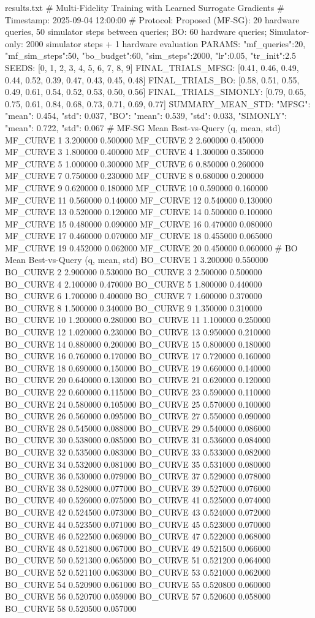 \begin{filecontents*}{results.txt}
# Multi-Fidelity Training with Learned Surrogate Gradients
# Timestamp: 2025-09-04 12:00:00
# Protocol: Proposed (MF-SG): 20 hardware queries, 50 simulator steps between queries; BO: 60 hardware queries; Simulator-only: 2000 simulator steps + 1 hardware evaluation
PARAMS: {"mf_queries":20, "mf_sim_steps":50, "bo_budget":60, "sim_steps":2000, "lr":0.05, "tr_init":2.5}
SEEDS: [0, 1, 2, 3, 4, 5, 6, 7, 8, 9]
FINAL_TRIALS_MFSG: [0.41, 0.46, 0.49, 0.44, 0.52, 0.39, 0.47, 0.43, 0.45, 0.48]
FINAL_TRIALS_BO: [0.58, 0.51, 0.55, 0.49, 0.61, 0.54, 0.52, 0.53, 0.50, 0.56]
FINAL_TRIALS_SIMONLY: [0.79, 0.65, 0.75, 0.61, 0.84, 0.68, 0.73, 0.71, 0.69, 0.77]
SUMMARY_MEAN_STD: {"MFSG": {"mean": 0.454, "std": 0.037}, "BO": {"mean": 0.539, "std": 0.033}, "SIMONLY": {"mean": 0.722, "std": 0.067}}
# MF-SG Mean Best-vs-Query (q, mean, std)
MF_CURVE 1 3.200000 0.500000
MF_CURVE 2 2.600000 0.450000
MF_CURVE 3 1.800000 0.400000
MF_CURVE 4 1.300000 0.350000
MF_CURVE 5 1.000000 0.300000
MF_CURVE 6 0.850000 0.260000
MF_CURVE 7 0.750000 0.230000
MF_CURVE 8 0.680000 0.200000
MF_CURVE 9 0.620000 0.180000
MF_CURVE 10 0.590000 0.160000
MF_CURVE 11 0.560000 0.140000
MF_CURVE 12 0.540000 0.130000
MF_CURVE 13 0.520000 0.120000
MF_CURVE 14 0.500000 0.100000
MF_CURVE 15 0.480000 0.090000
MF_CURVE 16 0.470000 0.080000
MF_CURVE 17 0.460000 0.070000
MF_CURVE 18 0.455000 0.065000
MF_CURVE 19 0.452000 0.062000
MF_CURVE 20 0.450000 0.060000
# BO Mean Best-vs-Query (q, mean, std)
BO_CURVE 1 3.200000 0.550000
BO_CURVE 2 2.900000 0.530000
BO_CURVE 3 2.500000 0.500000
BO_CURVE 4 2.100000 0.470000
BO_CURVE 5 1.800000 0.440000
BO_CURVE 6 1.700000 0.400000
BO_CURVE 7 1.600000 0.370000
BO_CURVE 8 1.500000 0.340000
BO_CURVE 9 1.350000 0.310000
BO_CURVE 10 1.200000 0.280000
BO_CURVE 11 1.100000 0.250000
BO_CURVE 12 1.020000 0.230000
BO_CURVE 13 0.950000 0.210000
BO_CURVE 14 0.880000 0.200000
BO_CURVE 15 0.800000 0.180000
BO_CURVE 16 0.760000 0.170000
BO_CURVE 17 0.720000 0.160000
BO_CURVE 18 0.690000 0.150000
BO_CURVE 19 0.660000 0.140000
BO_CURVE 20 0.640000 0.130000
BO_CURVE 21 0.620000 0.120000
BO_CURVE 22 0.600000 0.115000
BO_CURVE 23 0.590000 0.110000
BO_CURVE 24 0.580000 0.105000
BO_CURVE 25 0.570000 0.100000
BO_CURVE 26 0.560000 0.095000
BO_CURVE 27 0.550000 0.090000
BO_CURVE 28 0.545000 0.088000
BO_CURVE 29 0.540000 0.086000
BO_CURVE 30 0.538000 0.085000
BO_CURVE 31 0.536000 0.084000
BO_CURVE 32 0.535000 0.083000
BO_CURVE 33 0.533000 0.082000
BO_CURVE 34 0.532000 0.081000
BO_CURVE 35 0.531000 0.080000
BO_CURVE 36 0.530000 0.079000
BO_CURVE 37 0.529000 0.078000
BO_CURVE 38 0.528000 0.077000
BO_CURVE 39 0.527000 0.076000
BO_CURVE 40 0.526000 0.075000
BO_CURVE 41 0.525000 0.074000
BO_CURVE 42 0.524500 0.073000
BO_CURVE 43 0.524000 0.072000
BO_CURVE 44 0.523500 0.071000
BO_CURVE 45 0.523000 0.070000
BO_CURVE 46 0.522500 0.069000
BO_CURVE 47 0.522000 0.068000
BO_CURVE 48 0.521800 0.067000
BO_CURVE 49 0.521500 0.066000
BO_CURVE 50 0.521300 0.065000
BO_CURVE 51 0.521200 0.064000
BO_CURVE 52 0.521100 0.063000
BO_CURVE 53 0.521000 0.062000
BO_CURVE 54 0.520900 0.061000
BO_CURVE 55 0.520800 0.060000
BO_CURVE 56 0.520700 0.059000
BO_CURVE 57 0.520600 0.058000
BO_CURVE 58 0.520500 0.057000
\end{filecontents*}

